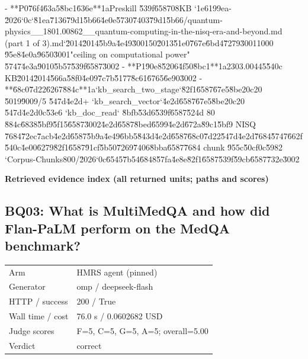 \documentclass[10pt]{article}
\begin{document}
\begin{AnswerText}
- **P0\u76f4\u63a5\u8bc1\u636e**\uff1aPreskill \u539f\u6587\uff08KB `1e6199ea-\u2026`\uff0c`\u81ea\u7136\u79d1\u5b66\u4e0e\u5730\u7403\u79d1\u5b66/quantum-physics__1801.00862__quantum-computing-in-the-nisq-era-and-beyond.md (part 1 of 3).md`\u2014\u2014\u5b9a\u4e49\u300150\u2013\u51e0\u767e\u6bd4\u7279\u30011000 \u95e8\u4e0a\u9650\u3001"ceiling on computational power" \u5747\u4e3a\u9010\u5b57\u539f\u6587\u3002
- **P1\u90e8\u5206\u4f50\u8bc1**\uff1a2303.00445\u540c KB\u2014\u2014\u566a\u58f0\u4e09\u7c7b\u5177\u8c61\u6765\u6e90\u3002
- **\u68c0\u7d22\u6267\u884c**\uff1a`kb_search_two_stage`\u82f1\u6587\u67e5\u8be2\uff0c20 \u5019\u9009/5 \u547d\u4e2d+ `kb_search_vector`\u4e2d\u6587\u67e5\u8be2\uff0c20 \u547d\u4e2d\uff0c\u53e6 `kb_doc_read` \u8bfb\u53d6\u539f\u6587\u524d 80 \u884c\u6838\u5bf9\u5f15\u6587\u3002\u4e2d\u6587\u8bed\u6599\u4e2d\u672a\u89c1\u5bf9 NISQ \u7684\u72ec\u7acb\u4e2d\u6587\u5b9a\u4e49\u6bb5\u843d\u4e2d\u6587\u68c0\u7d22\u547d\u4e2d\u7684\u5747\u662f\u540c\u4e00\u6279\u82f1\u6587\u91cf\u5b50\u7269\u7406\u8bba\u6587\u7684 chunk \u955c\u50cf\uff0c\u5982 `Corpus-Chunks800/\u2026`\uff0c\u6545\u7b54\u6848\u57fa\u4e8e\u82f1\u6587\u539f\u59cb\u6587\u732e\u3002
\end{AnswerText}

\textbf{Retrieved evidence index (all returned units; paths and scores) }
\begin{EvidenceText}
\end{EvidenceText}
\subsection{BQ03: What is MultiMedQA and how did Flan-PaLM perform on the MedQA benchmark?}
\begin{tabular}{@{}ll@{}}
Arm & HMRS agent (pinned)\\
Generator & omp / deepseek-flash\\
HTTP / success & 200 / True\\
Wall time / cost & 76.0 s / 0.0602682 USD\\
Judge scores & F=5, C=5, G=5, A=5; overall=5.00\\
Verdict & correct\\
\end{tabular}
\end{document}

